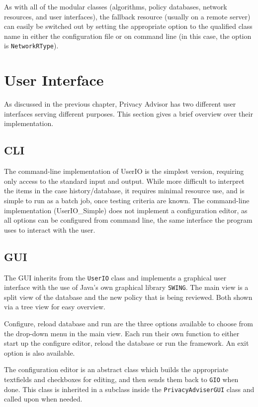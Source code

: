 As with all of the modular classes (algorithms, policy databases, network resources, and user interfaces), the fallback resource (usually on a remote server) can easily be switched out by setting the appropriate  option to the qualified class name in either the configuration file or on command line (in this case, the option is \texttt{NetworkRType}).

\section{User Interface} %
As discussed in the previous chapter, Privacy Advisor has two different user interfaces serving different purposes. This section gives a brief overview over their implementation.

\subsection{CLI}  %

The command-line implementation of UserIO is the simplest version, requiring only access to the standard input and output. While more difficult to interpret the items in the case history/database, it requires minimal resource use, and is simple to run as a batch job, once testing criteria are known. The command-line implementation (UserIO\_Simple) does not implement a configuration editor, as all options can be configured from command line, the same interface the program uses to interact with the user. 


\subsection{GUI}  
The GUI inherits from the \texttt{UserIO} class and implements a graphical user interface with the use of Java's own graphical library \texttt{SWING}. The main view is a split view of the database and the new policy that is being reviewed. Both shown via a tree view for easy overview.

Configure, reload database and run are the three options available to choose from the drop-down menu in the main view. Each run their own function to either start up the configure editor, reload the database or run the framework. An exit option is also available.

The configuration editor is an abstract class which builds the appropriate textfields and checkboxes for editing, and then sends them back to \texttt{GIO} when done. This class is inherited in a subclass inside the \texttt{PrivacyAdviserGUI} class and called upon when needed.
